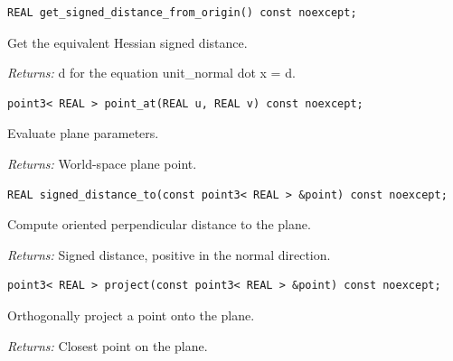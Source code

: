 \par\noindent\begin{minipage}{\linewidth}
\begin{lstlisting}[style=apireference]
REAL get_signed_distance_from_origin() const noexcept;
\end{lstlisting}
{\footnotesize Get the equivalent Hessian signed distance.\par}
{\footnotesize\textit{Returns:} d for the equation unit\_normal dot x = d.\par}
\end{minipage}\par\vspace{1pt}
\par\noindent\begin{minipage}{\linewidth}
\begin{lstlisting}[style=apireference]
point3< REAL > point_at(REAL u, REAL v) const noexcept;
\end{lstlisting}
{\footnotesize Evaluate plane parameters.\par}
{\footnotesize\textit{Returns:} World-space plane point.\par}
\end{minipage}\par\vspace{1pt}
\par\noindent\begin{minipage}{\linewidth}
\begin{lstlisting}[style=apireference]
REAL signed_distance_to(const point3< REAL > &point) const noexcept;
\end{lstlisting}
{\footnotesize Compute oriented perpendicular distance to the plane.\par}
{\footnotesize\textit{Returns:} Signed distance, positive in the normal direction.\par}
\end{minipage}\par\vspace{1pt}
\par\noindent\begin{minipage}{\linewidth}
\begin{lstlisting}[style=apireference]
point3< REAL > project(const point3< REAL > &point) const noexcept;
\end{lstlisting}
{\footnotesize Orthogonally project a point onto the plane.\par}
{\footnotesize\textit{Returns:} Closest point on the plane.\par}
\end{minipage}\par\vspace{1pt}
